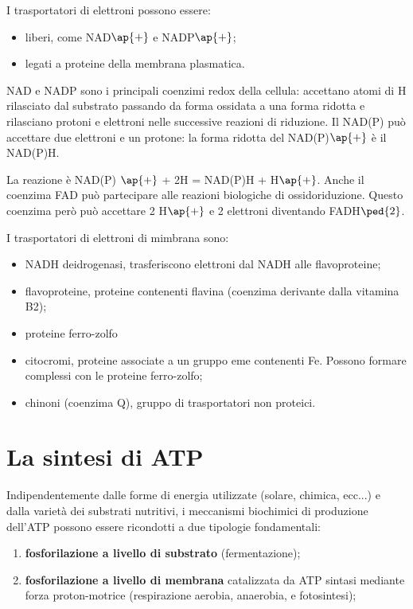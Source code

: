\documentclass[11pt]{book}
\begin{document}
\vspace{1em}
I trasportatori di elettroni possono essere: 
\begin{itemize}
\item liberi, come NAD$\ap{+}$ e NADP$\ap{+}$;
\item legati a proteine della membrana plasmatica.
\end{itemize}

NAD e NADP sono i principali coenzimi redox della cellula: accettano atomi di H rilasciato dal substrato passando da forma ossidata a una forma ridotta e rilasciano protoni e elettroni nelle successive reazioni di riduzione. 
Il NAD(P) può accettare due elettroni e un protone: la forma ridotta del NAD(P)$\ap{+}$ è il NAD(P)H. 

La reazione è NAD(P) $\ap{+}$ + 2H = NAD(P)H + H$\ap{+}$.
Anche il coenzima FAD può partecipare alle reazioni biologiche di ossidoriduzione. Questo coenzima però può accettare 2 H$\ap{+}$ e 2 elettroni diventando FADH$\ped{2}$.

\vspace{1em}
I trasportatori di elettroni di mimbrana sono:
\begin{itemize}
\item NADH deidrogenasi, trasferiscono elettroni dal NADH alle flavoproteine;
\item flavoproteine, proteine contenenti flavina (coenzima derivante dalla vitamina B2);
\item proteine ferro-zolfo
\item citocromi, proteine associate a un gruppo eme contenenti Fe. Possono formare complessi con le proteine ferro-zolfo;
\item chinoni (coenzima Q), gruppo di trasportatori non proteici. 
\end{itemize}







\section{La sintesi di ATP}
Indipendentemente dalle forme di energia utilizzate (solare, chimica, ecc...) e dalla varietà dei substrati nutritivi, i meccanismi biochimici di produzione dell’ATP possono essere ricondotti a due tipologie fondamentali:
\begin{enumerate}
\item \textbf{fosforilazione a livello di substrato} (fermentazione); 
\item \textbf{fosforilazione a livello di membrana} catalizzata da ATP sintasi mediante forza proton-motrice (respirazione aerobia, anaerobia, e fotosintesi);
\end{enumerate}
\end{document}
